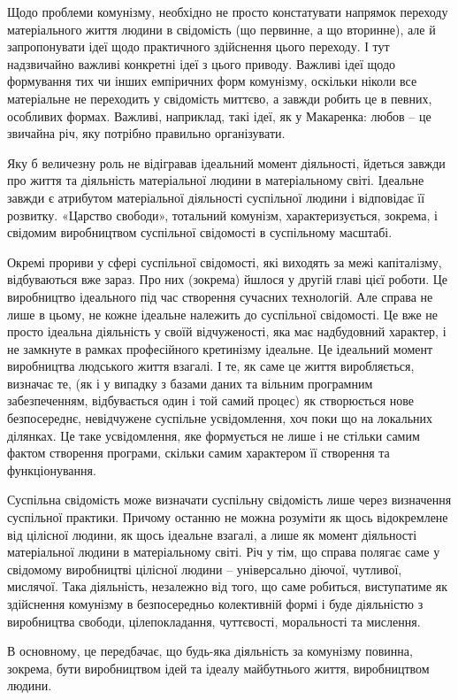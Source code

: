 \documentclass[../main]{subfiles}
\begin{document}
Щодо проблеми комунізму, необхідно не просто констатувати напрямок переходу матеріального життя людини в свідомість (що первинне, а що вторинне), але й запропонувати ідеї щодо практичного здійснення цього переходу. І тут надзвичайно важливі конкретні ідеї з цього приводу. Важливі ідеї щодо формування тих чи інших емпіричних форм комунізму, оскільки ніколи все матеріальне не переходить у свідомість миттєво, а завжди робить це в певних, особливих формах. Важливі, наприклад, такі ідеї, як у Макаренка: любов – це звичайна річ, яку потрібно правильно організувати.

Яку б величезну роль не відігравав ідеальний момент діяльності, йдеться завжди про життя та діяльність матеріальної людини в матеріальному світі. Ідеальне завжди є атрибутом матеріальної діяльності суспільної людини і відповідає її розвитку. «Царство свободи», тотальний комунізм, характеризується, зокрема, і свідомим виробництвом суспільної свідомості в суспільному масштабі.

Окремі прориви у сфері суспільної свідомості, які виходять за межі капіталізму, відбуваються вже зараз. Про них (зокрема) йшлося у другій главі цієї роботи. Це виробництво ідеального під час створення сучасних технологій. Але справа не лише в цьому, не кожне ідеальне належить до суспільної свідомості. Це вже не просто ідеальна діяльність у своїй відчуженості, яка має надбудовний характер, і не замкнуте в рамках професійного кретинізму ідеальне. Це ідеальний момент виробництва людського життя взагалі. І те, як саме це життя виробляється, визначає те, (як і у випадку з базами даних та вільним програмним забезпеченням, відбувається один і той самий процес) як створюється нове безпосереднє, невідчужене суспільне усвідомлення, хоч поки що на локальних ділянках. Це таке усвідомлення, яке формується не лише і не стільки самим фактом створення програми, скільки самим характером її створення та функціонування.

Суспільна свідомість може визначати суспільну свідомість лише через визначення суспільної практики. Причому останню не можна розуміти як щось відокремлене від цілісної людини, як щось ідеальне взагалі, а лише як момент діяльності матеріальної людини в матеріальному світі. Річ у тім, що справа полягає саме у свідомому виробництві цілісної людини – універсально діючої, чутливої, мислячої. Така діяльність, незалежно від того, що саме робиться, виступатиме як здійснення комунізму в безпосередньо колективній формі і буде діяльністю з виробництва свободи, цілепокладання, чуттєвості, моральності та мислення.

В основному, це передбачає, що будь-яка діяльність за комунізму повинна, зокрема, бути виробництвом ідей та ідеалу майбутнього життя, виробництвом людини.
\end{document}
